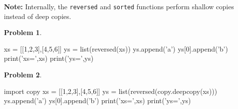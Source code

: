 \documentclass[12pt]{article}
\theoremstyle{definition}
\newtheorem{problem}{Problem}
\begin{document}
\newpage
\noindent
\textbf{Note:}
Internally, the \texttt{reversed} and \texttt{sorted} functions perform shallow copies instead of deep copies.

\begin{problem}
~~~
\begin{python}
xs = [[1,2,3],[4,5,6]]
ys = list(reversed(xs))
ys.append('a')
ys[0].append('b')
print('xs=',xs)
print('ys=',ys)
\end{python}
\end{problem}
\vspace{2in}

\begin{problem}
~~~
\begin{python}
import copy
xs = [[1,2,3],[4,5,6]]
ys = list(reversed(copy.deepcopy(xs)))
ys.append('a')
ys[0].append('b')
print('xs=',xs)
print('ys=',ys)
\end{python}
\end{problem}
\end{document}
